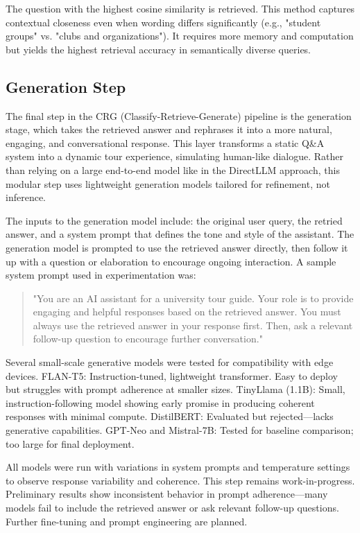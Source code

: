 \documentclass[conference]{IEEEtran}
\begin{document}
The question with the highest cosine similarity is retrieved. 
This method captures contextual closeness even when wording differs significantly (e.g., "student groups" vs. "clubs and organizations"). 
It requires more memory and computation but yields the highest retrieval accuracy in semantically diverse queries.

\subsection{Generation Step}
The final step in the CRG (Classify-Retrieve-Generate) pipeline is the generation stage, which takes the retrieved answer and rephrases it into a more natural, engaging, and conversational response. 
This layer transforms a static Q\&A system into a dynamic tour experience, simulating human-like dialogue. 
Rather than relying on a large end-to-end model like in the DirectLLM approach, this modular step uses lightweight generation models tailored for refinement, not inference.

The inputs to the generation model include: the original user query, the retried answer, and a system prompt that defines the tone and style of the assistant.
The generation model is prompted to use the retrieved answer directly, then follow it up with a question or elaboration to encourage ongoing interaction. 
A sample system prompt used in experimentation was:

\begin{quote}
    "You are an AI assistant for a university tour guide. 
    Your role is to provide engaging and helpful responses based on the retrieved answer. 
    You must always use the retrieved answer in your response first. 
    Then, ask a relevant follow-up question to encourage further conversation."
\end{quote}

Several small-scale generative models were tested for compatibility with edge devices.
FLAN-T5: Instruction-tuned, lightweight transformer. Easy to deploy but struggles with prompt adherence at smaller sizes.
TinyLlama (1.1B): Small, instruction-following model showing early promise in producing coherent responses with minimal compute.
DistilBERT: Evaluated but rejected—lacks generative capabilities.
GPT-Neo and Mistral-7B: Tested for baseline comparison; too large for final deployment.

All models were run with variations in system prompts and temperature settings to observe response variability and coherence.
This step remains work-in-progress. 
Preliminary results show inconsistent behavior in prompt adherence—many models fail to include the retrieved answer or ask relevant follow-up questions. 
Further fine-tuning and prompt engineering are planned.
\end{document}
